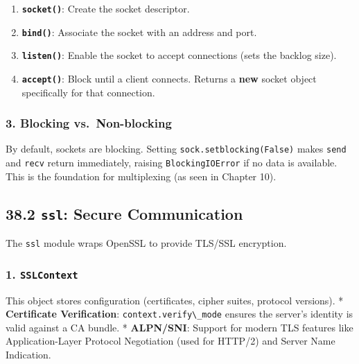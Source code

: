 \begin{enumerate}
\def\labelenumi{\arabic{enumi}.}
\tightlist
\item
  \textbf{\passthrough{\lstinline!socket()!}}: Create the socket
  descriptor.
\item
  \textbf{\passthrough{\lstinline!bind()!}}: Associate the socket with
  an address and port.
\item
  \textbf{\passthrough{\lstinline!listen()!}}: Enable the socket to
  accept connections (sets the backlog size).
\item
  \textbf{\passthrough{\lstinline!accept()!}}: Block until a client
  connects. Returns a \textbf{new} socket object specifically for that
  connection.
\end{enumerate}

\hypertarget{blocking-vs.-non-blocking}{%
\subsubsection{3. Blocking
vs.~Non-blocking}\label{blocking-vs.-non-blocking}}

By default, sockets are blocking. Setting
\passthrough{\lstinline!sock.setblocking(False)!} makes
\passthrough{\lstinline!send!} and \passthrough{\lstinline!recv!} return
immediately, raising \passthrough{\lstinline!BlockingIOError!} if no
data is available. This is the foundation for multiplexing (as seen in
Chapter 10).

\hypertarget{ssl-secure-communication}{%
\subsection{\texorpdfstring{38.2 \texttt{ssl}: Secure
Communication}{38.2 ssl: Secure Communication}}\label{ssl-secure-communication}}

The \passthrough{\lstinline!ssl!} module wraps OpenSSL to provide
TLS/SSL encryption.

\hypertarget{sslcontext}{%
\subsubsection{\texorpdfstring{1.
\texttt{SSLContext}}{1. SSLContext}}\label{sslcontext}}

This object stores configuration (certificates, cipher suites, protocol
versions). * \textbf{Certificate Verification}:
\passthrough{\lstinline!context.verify\_mode!} ensures the server's
identity is valid against a CA bundle. * \textbf{ALPN/SNI}: Support for
modern TLS features like Application-Layer Protocol Negotiation (used
for HTTP/2) and Server Name Indication.

